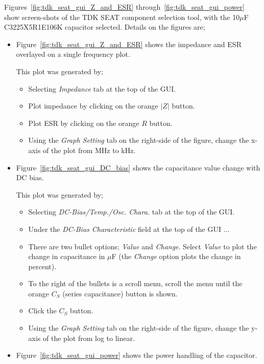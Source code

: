 \documentclass[10pt,twoside]{article}
\begin{document}
Figures~\ref{fig:tdk_seat_gui_Z_and_ESR} through~\ref{fig:tdk_seat_gui_power}
show screen-shots of the TDK SEAT component selection tool, with
the 10$\mu$F C3225X5R1E106K capacitor selected. Details on
the figures are;
%
\begin{itemize}
%
\item
Figure~\ref{fig:tdk_seat_gui_Z_and_ESR} shows the impedance and ESR overlayed
on a single frequency plot. 

This plot was generated by;
\begin{itemize}
\item Selecting {\em Impedance} tab at the top of the GUI.
\item Plot impedance by clicking on the orange $|Z|$ button.
\item Plot ESR by clicking on the orange $R$ button.
\item Using the {\em Graph Setting} tab on the right-side of the figure,
change the x-axis of the plot from MHz to kHz.
\end{itemize}
%
\item Figure~\ref{fig:tdk_seat_gui_DC_bias} shows the capacitance value change
with DC bias.

This plot was generated by;
\begin{itemize}
\item Selecting {\em DC-Bias/Temp./Osc. Chara.} tab at the top of the GUI.
\item Under the {\em DC-Bias Characteristic} field at the top of the GUI $\dots$
\item There are two bullet options; {\em Value} and {\em Change}. 
Select {\em Value} to plot the change in capacitance in $\mu$F
(the {\em Change} option plots the change in percent). 
\item To the right of the bullets is a scroll menu, scroll the menu
until the orange $C_S$ (series capacitance) button is shown. 
\item Click the $C_S$ button.
\item Using the {\em Graph Setting} tab on the right-side of the figure,
change the y-axis of the plot from log to linear.
\end{itemize}
%
\item Figure~\ref{fig:tdk_seat_gui_power} shows the power handling
of the capacitor.


\end{itemize}
\end{document}
